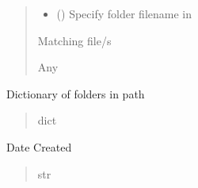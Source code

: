 \documentclass[letterpaper,10pt,english]{sphinxmanual}
\begin{document}
\begin{fulllineitems}
\begin{fulllineitems}
\begin{quote}
\begin{description}
\begin{itemize}
\item {} 
\sphinxAtStartPar
{} () \textendash{} Specify folder filename in

\end{itemize}

\sphinxAtStartPar
Matching file/s

\sphinxAtStartPar
Any

\end{description}\end{quote}

\end{fulllineitems}


\begin{fulllineitems}
\label{\detokenize{Organization:Organization.Data.folders}}
\pysigstartsignatures
{}
\pysigstopsignatures
\sphinxAtStartPar
Dictionary of folders in path
\begin{quote}\begin{description}
\sphinxAtStartPar
dict

\end{description}\end{quote}

\end{fulllineitems}


\begin{fulllineitems}
\label{\detokenize{Organization:Organization.Data.instance_date}}
\pysigstartsignatures
{}
\pysigstopsignatures
\sphinxAtStartPar
Date Created
\begin{quote}\begin{description}
\sphinxAtStartPar
str

\end{description}\end{quote}


\end{fulllineitems}
\end{fulllineitems}
\end{document}
